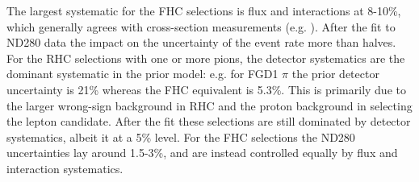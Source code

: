 The largest systematic for the FHC selections is flux and interactions at 8-10\%, which generally agrees with cross-section measurements (e.g. \cite{MIN_pion_2016,miniboone_nu_ccqe}). After the fit to ND280 data the impact on the uncertainty of the event rate more than halves. For the RHC selections with one or more pions, the detector systematics are the dominant systematic in the prior model: e.g. for FGD1 $\pi$ the prior detector uncertainty is 21\% whereas the FHC equivalent is 5.3\%. This is primarily due to the larger wrong-sign background in RHC and the proton background in selecting the lepton candidate. After the fit these selections are still dominated by detector systematics, albeit it at a 5\% level. For the FHC selections the ND280 uncertainties lay around 1.5-3\%, and are instead controlled equally by flux and interaction systematics.

